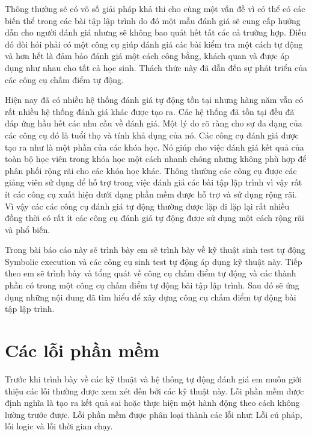 \documentclass[12pt,a4paper]{report}
\begin{document}
\indent Thông thường sẽ có vô số giải pháp khả thi cho cùng một vấn đề vì có thể có các biến thể trong các bài tập lập trình do đó một mẫu đánh giá sẽ cung cấp hướng dẫn cho người đánh giá nhưng sẽ không bao quát hết tất các cả trường hợp. Điều đó đòi hỏi phải có một công cụ giúp đánh giá các bài kiểm tra một cách tự động và hơn hết là đảm bảo đánh giá một cách công bằng, khách quan và được áp dụng như nhau cho tất cả học sinh. Thách thức này đã dẫn đến sự phát triển của các công cụ chấm điểm tự động.

\indent Hiện nay đã có nhiều hệ thống đánh giá tự động tồn tại nhưng hàng năm vẫn có rất nhiều hệ thống đánh giá khác được tạo ra. Các hệ thống đã tồn tại đều đã đáp ứng hầu hết các nhu cầu về đánh giá. Một lý do rõ ràng cho sự đa dạng của các công cụ đó là tuổi thọ và tính khả dụng của nó. Các công cụ đánh giá được tạo ra như là một phần của các khóa học. Nó giúp cho việc đánh giá kết quả của toàn bộ học viên trong khóa học một cách nhanh chóng nhưng không phù hợp để phân phối rộng rãi cho các khóa học khác. Thông thường các công cụ được các giảng viên sử dụng để hỗ trợ trong việc đánh giá các bài tập lập trình vì vậy rất ít các công cụ xuất hiện dưới dạng phần mềm được hỗ trợ và sử dụng rộng rãi. Vì vậy các các công cụ đánh giá tự động thường được lặp đi lặp lại rất nhiều đồng thời có rất ít các công cụ đánh giá tự động được sử dụng một cách rộng rãi và phổ biến.

\indent  Trong bài báo cáo này sẽ trình bày em sẽ trình bày về kỹ thuật sinh test tự động Symbolic execution và các công cụ sinh test tự động áp dụng kỹ thuật này. Tiếp theo em sẽ trình bày và tổng quát về công cụ chấm điểm tự động và các thành phần có trong một công cụ chấm điểm tự động bài tập lập trình. Sau đó sẽ ứng dụng những nội dung đã tìm hiểu để xây dựng công cụ chấm điểm tự động bài tập lập trình.

\section{Các lỗi phần mềm}
Trước khi trình bày về các kỹ thuật và hệ thống tự động đánh giá em muốn giới thiệu các lỗi thường được xem xét đến bởi các kỹ thuật này. Lỗi phần mềm được định nghĩa là tạo ra kết quả sai hoặc thực hiện một hành động theo cách không lường trước được. Lỗi phần mềm được phân loại thành các lỗi như: Lỗi cú pháp, lỗi logic và lỗi thời gian chạy.
\end{document}
